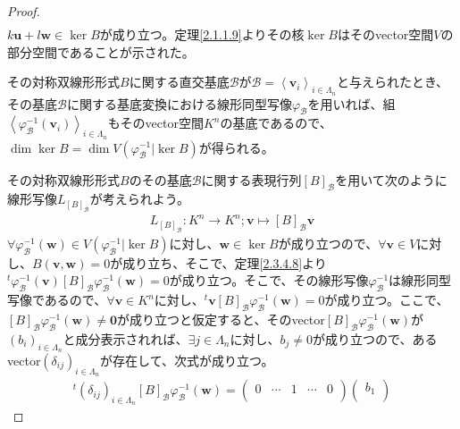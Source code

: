 \documentclass[dvipdfmx]{jsarticle}
\begin{document}
\begin{proof}
\begin{align*}
\end{align*}
$k\mathbf{u} + l\mathbf{w} \in \ker B$が成り立つ。定理\ref{2.1.1.9}よりその核$\ker B$はそのvector空間$V$の部分空間であることが示された。\par
その対称双線形形式$B$に関する直交基底$\mathcal{B}$が$\mathcal{B} =\left\langle \mathbf{v}_{i} \right\rangle_{i \in \varLambda_{n}}$と与えられたとき、その基底$\mathcal{B}$に関する基底変換における線形同型写像$\varphi_{\mathcal{B}}$を用いれば、組$\left\langle \varphi_{\mathcal{B}}^{- 1}\left( \mathbf{v}_{i} \right) \right\rangle_{i \in \varLambda_{n}}$もそのvector空間$K^{n}$の基底であるので、$\dim{\ker B} = \dim{V\left( \varphi_{\mathcal{B}}^{- 1}|\ker B \right)}$が得られる。\par
その対称双線形形式$B$のその基底$\mathcal{B}$に関する表現行列$[ B]_{\mathcal{B}}$を用いて次のように線形写像$L_{[ B]_{\mathcal{B}}}$が考えられよう。
\begin{align*}
L_{[ B]_{\mathcal{B}}}:K^{n} \rightarrow K^{n};\mathbf{v} \mapsto [ B]_{\mathcal{B}}\mathbf{v}
\end{align*}
$\forall\varphi_{\mathcal{B}}^{- 1}\left( \mathbf{w} \right) \in V\left( \varphi_{\mathcal{B}}^{- 1}|\ker B \right)$に対し、$\mathbf{w} \in \ker B$が成り立つので、$\forall\mathbf{v} \in V$に対し、$B\left( \mathbf{v},\mathbf{w} \right) = 0$が成り立ち、そこで、定理\ref{2.3.4.8}より$^{t}\varphi_{\mathcal{B}}^{- 1}\left( \mathbf{v} \right)[ B]_{\mathcal{B}}\varphi_{\mathcal{B}}^{- 1}\left( \mathbf{w} \right) = 0$が成り立つ。そこで、その線形写像$\varphi_{\mathcal{B}}^{- 1}$は線形同型写像であるので、$\forall\mathbf{v} \in K^{n}$に対し、$^{t}\mathbf{v}[ B]_{\mathcal{B}}\varphi_{\mathcal{B}}^{- 1}\left( \mathbf{w} \right) = 0$が成り立つ。ここで、$[ B]_{\mathcal{B}}\varphi_{\mathcal{B}}^{- 1}\left( \mathbf{w} \right) \neq \mathbf{0}$が成り立つと仮定すると、そのvector$[ B]_{\mathcal{B}}\varphi_{\mathcal{B}}^{- 1}\left( \mathbf{w} \right)$が$\left( b_{i} \right)_{i \in \varLambda_{n}}$と成分表示されれば、$\exists j \in \varLambda_{n}$に対し、$b_{j} \neq 0$が成り立つので、あるvector$\left( \delta_{ij} \right)_{i \in \varLambda_{n}}$が存在して、次式が成り立つ。
\begin{align*}
^{t}\left( \delta_{ij} \right)_{i \in \varLambda_{n}}[ B]_{\mathcal{B}}\varphi_{\mathcal{B}}^{- 1}\left( \mathbf{w} \right) = \begin{pmatrix}
0 & \cdots & 1 & \cdots & 0 \\
\end{pmatrix}\begin{pmatrix}
b_{1} \\

\end{pmatrix}
\end{align*}
\end{proof}
\end{document}

